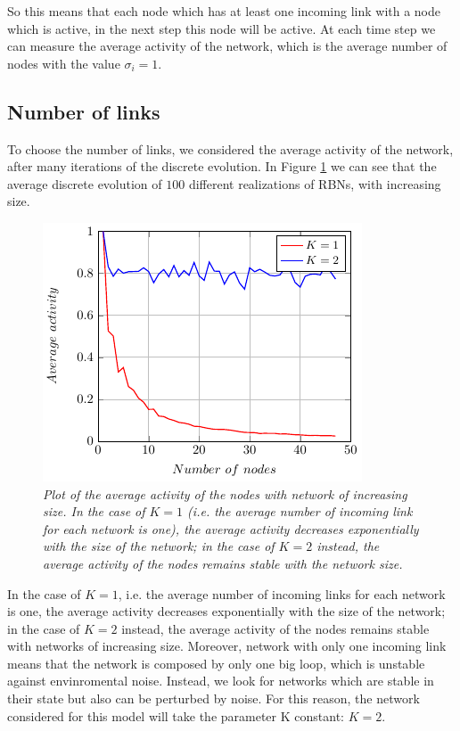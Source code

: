 So this means that each node which has at least one incoming link with a node which is active, in the next step this node will be active.
At each time step we can measure the average activity of the network, which is the average number of nodes with the value $\sigma_i = 1$.

\subsection{Number of links}
To choose the number of links, we considered the average activity of the network, after many iterations of the discrete evolution. In Figure \ref{fig:K} we can see that the average discrete evolution of $100$ different realizations of RBNs, with increasing size.
\begin{figure}[h]
\centering
\includegraphics[scale=1.5]{images/K.pdf}
\caption{\emph{Plot of the average activity of the nodes with network of increasing size.
In the case of $K=1$ (i.e. the average number of incoming link for each network is one), the average activity decreases exponentially with the size of the network; in the case of $K=2$ instead, the average activity of the nodes remains stable with the network size.}}
\label{fig:K}
\end{figure}
In the case of $K=1$, i.e. the average number of incoming links for each network is one, the average activity decreases exponentially with the size of the network; in the case of $K=2$ instead, the average activity of the nodes remains stable with networks of increasing size. Moreover, network with only one incoming link means that the network is composed by only one big loop, which is unstable against envinromental noise. Instead, we look for networks which are stable in their state but also can be perturbed by noise. For this reason, the network considered for this model will take the parameter K constant: $K=2$.
